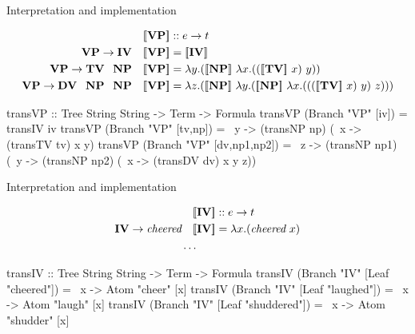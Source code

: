 \documentclass[xcolor=dvipsnames]{beamer}
\newcommand{\sem}[1]{\ensuremath{[\hspace{-1.8pt}[ #1 ]\hspace{-1.8pt}]}}
\begin{document}
\begin{frame}[fragile]{Interpretation and implementation}

\begin{align*}
&\quad \sem{\textbf{VP}} :: e\to t \\
\textbf{VP} \to \textbf{IV} &\quad \sem{\textbf{VP}} = \sem{\textbf{IV}} \\ 
\textbf{VP} \to \textbf{TV\ \ NP} &\quad \sem{\textbf{VP}} = \lambda y.(\sem{\textbf{NP}}\ \lambda x.((\sem{\textbf{TV}}\ x)\ y))\\
\textbf{VP} \to \textbf{DV\ \ NP\ \ NP} &\quad \sem{\textbf{VP}} = \lambda z.(\sem{\textbf{NP}}\ \lambda y.(\sem{\textbf{NP}}\ \lambda x.(((\sem{\textbf{TV}}\ x)\ y)\ z)))
\end{align*}
\begin{code}
transVP :: Tree String String -> Term -> Formula
transVP (Branch "VP" [iv]) = transIV iv 
transVP (Branch "VP" [tv,np]) = 
  \ y -> (transNP np)  (\ x -> (transTV tv) x y)
transVP (Branch "VP" [dv,np1,np2]) = 
  \ z -> (transNP np1) (\ y -> (transNP np2) 
                                (\ x -> (transDV dv) x y z))
\end{code}
\end{frame}

\begin{frame}[fragile]{Interpretation and implementation}

\begin{align*}
&\quad \sem{\textbf{IV}} :: e\to t \\
\textbf{IV} \to \text{\em cheered} &\quad \sem{\textbf{IV}} = \lambda x.(\text{\em cheered}\ x) \\
 & \ldots \\
\end{align*}
\begin{code}
transIV :: Tree String String -> Term -> Formula 
transIV (Branch "IV" [Leaf "cheered"]) = 
                                   \ x -> Atom "cheer" [x]
transIV (Branch "IV" [Leaf "laughed"]) = 
                                   \ x -> Atom "laugh" [x] 
transIV (Branch "IV" [Leaf "shuddered"]) = 
                                   \ x -> Atom "shudder" [x]  
\end{code}
\end{frame}
\end{document}
